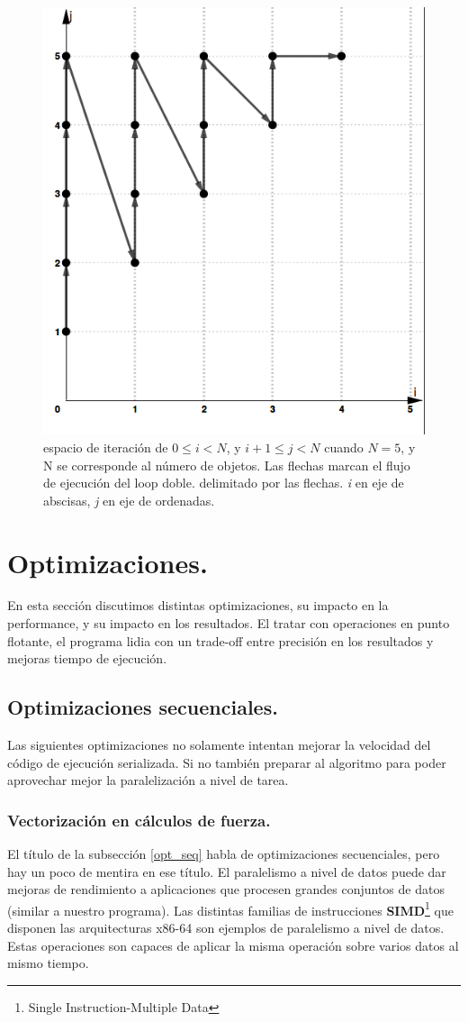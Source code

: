 \documentclass{article}
\begin{document}
\begin{figure}[h!]
	\centering
	\includegraphics[width=0.6\linewidth,height=0.6\textwidth]{resources/loop_anidado_no_tiling_505x565.png}
	\caption{espacio de iteración de $0\leq{i} < {N}$, y $i+1\leq{j} < {N}$
	cuando ${N}=5$, y N se corresponde al número de objetos. Las flechas marcan el flujo de ejecución del loop doble.
	delimitado por las flechas. \textit{i} en eje de abscisas, \textit{j} en eje de ordenadas.}
	\label{fig:no_tiling}
\end{figure}

\section{Optimizaciones.\label{opt}}

En esta sección discutimos distintas optimizaciones, su impacto en la performance,
y su impacto en los resultados. El tratar con operaciones en punto flotante, el programa
lidia con un trade-off entre precisión en los resultados y mejoras tiempo de ejecución.

\subsection{Optimizaciones secuenciales.\label{opt_seq}}
Las siguientes optimizaciones no solamente intentan mejorar la velocidad
del código de ejecución serializada. Si no también preparar al algoritmo
para poder aprovechar mejor la paralelización a nivel de tarea.

\subsubsection{Vectorización en cálculos de fuerza.\label{simd}}
El título de la subsección \ref{opt_seq} habla de optimizaciones secuenciales, pero hay un poco de mentira
en ese título. El paralelismo a nivel de datos puede dar mejoras de rendimiento a aplicaciones
que procesen grandes conjuntos de datos (similar a nuestro programa). Las distintas familias de instrucciones
\textbf{SIMD}\footnote{Single Instruction-Multiple Data} que disponen las arquitecturas x86-64 son
ejemplos de paralelismo a nivel de datos. Estas operaciones son capaces de aplicar la misma operación sobre varios
datos al mismo tiempo.
\end{document}
